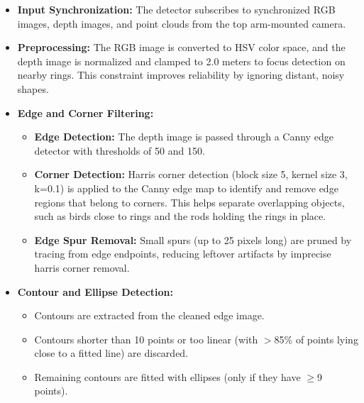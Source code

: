 \documentclass[a4paper]{article}
\begin{document}
\begin{itemize}
    \item \textbf{Input Synchronization:} The detector subscribes to synchronized RGB images, depth images, and point clouds from the top arm-mounted camera.

    \item \textbf{Preprocessing:} The RGB image is converted to HSV color space, and the depth image is normalized and clamped to 2.0 meters to focus detection on nearby rings. This constraint improves reliability by ignoring distant, noisy shapes.

    \item \textbf{Edge and Corner Filtering:}
    \begin{itemize}
        \item \textbf{Edge Detection:} The depth image is passed through a Canny edge detector with thresholds of 50 and 150.
        \item \textbf{Corner Detection:} Harris corner detection (block size 5, kernel size 3, k=0.1) is applied to the Canny edge map to identify and remove edge regions that belong to corners. This helps separate overlapping objects, such as birds close to rings and the rods holding the rings in place.
        \item \textbf{Edge Spur Removal:} Small spurs (up to 25 pixels long) are pruned by tracing from edge endpoints, reducing leftover artifacts by imprecise harris corner removal.
    \end{itemize}

    \item \textbf{Contour and Ellipse Detection:}
    \begin{itemize}
        \item Contours are extracted from the cleaned edge image.
        \item Contours shorter than 10 points or too linear (with $>$85\% of points lying close to a fitted line) are discarded.
        \item Remaining contours are fitted with ellipses (only if they have $\geq$9 points).
    \end{itemize}


\end{itemize}
\end{document}
